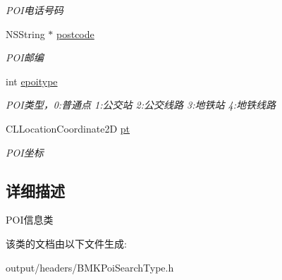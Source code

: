 \begin{DoxyCompactItemize}
\begin{DoxyCompactList}\small\item\em P\+O\+I电话号码 \end{DoxyCompactList}\item 
\hypertarget{interface_b_m_k_poi_info_a696c50cfef411e4c8aa4a53693c26dc5}{}N\+S\+String $\ast$ \hyperlink{interface_b_m_k_poi_info_a696c50cfef411e4c8aa4a53693c26dc5}{postcode}\label{interface_b_m_k_poi_info_a696c50cfef411e4c8aa4a53693c26dc5}

\begin{DoxyCompactList}\small\item\em P\+O\+I邮编 \end{DoxyCompactList}\item 
\hypertarget{interface_b_m_k_poi_info_ada3ccb40708069fe5d82414af8de1ab5}{}int \hyperlink{interface_b_m_k_poi_info_ada3ccb40708069fe5d82414af8de1ab5}{epoitype}\label{interface_b_m_k_poi_info_ada3ccb40708069fe5d82414af8de1ab5}

\begin{DoxyCompactList}\small\item\em P\+O\+I类型，0\+:普通点 1\+:公交站 2\+:公交线路 3\+:地铁站 4\+:地铁线路 \end{DoxyCompactList}\item 
\hypertarget{interface_b_m_k_poi_info_a6ace0b9f9462c1695317654d92c3795a}{}C\+L\+Location\+Coordinate2\+D \hyperlink{interface_b_m_k_poi_info_a6ace0b9f9462c1695317654d92c3795a}{pt}\label{interface_b_m_k_poi_info_a6ace0b9f9462c1695317654d92c3795a}

\begin{DoxyCompactList}\small\item\em P\+O\+I坐标 \end{DoxyCompactList}\end{DoxyCompactItemize}


\subsection{详细描述}
P\+O\+I信息类 

该类的文档由以下文件生成\+:\begin{DoxyCompactItemize}
\item 
output/headers/B\+M\+K\+Poi\+Search\+Type.\+h\end{DoxyCompactItemize}
